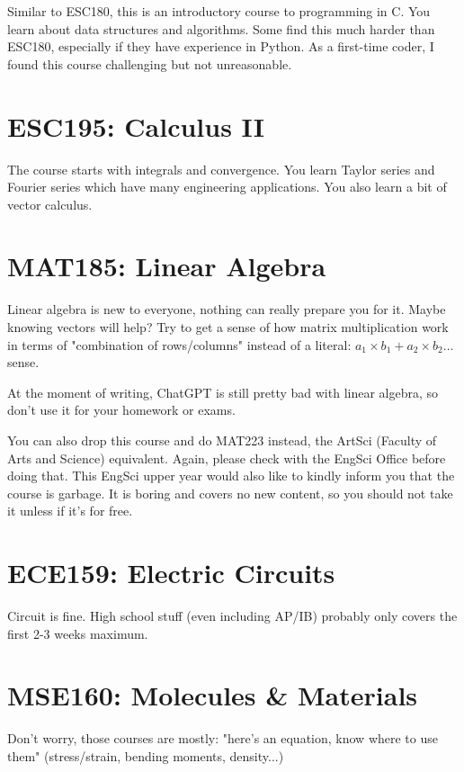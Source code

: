 Similar to ESC180, this is an introductory course to programming in C. You learn about data structures and algorithms. Some find this much harder than ESC180, especially if they have experience in Python. As a first-time coder, I found this course challenging but not unreasonable.
\section{ESC195: Calculus II}

The course starts with integrals and convergence. You learn Taylor series and Fourier series which have many engineering applications. You also learn a bit of vector calculus.

\section{MAT185: Linear Algebra}

Linear algebra is new to everyone, nothing can really prepare you for it. Maybe knowing vectors will help? Try to get a sense of how matrix multiplication work in terms of "combination of rows/columns" instead of a literal: $a_1\times b_1 + a_2\times b_2\dots$ sense.

At the moment of writing, ChatGPT is still pretty bad with linear algebra, so don't use it for your homework or exams.

You can also drop this course and do MAT223 instead, the ArtSci (Faculty of Arts and Science) equivalent. Again, please check with the EngSci Office before doing that. This EngSci upper year would also like to kindly inform you that the course is garbage. It is boring and covers no new content, so you should not take it unless if it's for free.

\section{ECE159: Electric Circuits}

Circuit is fine. High school stuff (even including AP/IB) probably only covers the first 2-3 weeks maximum.

\section{MSE160: Molecules \& Materials}

Don't worry, those courses are mostly: "here's an equation, know where to use them" (stress/strain, bending moments, density...)
